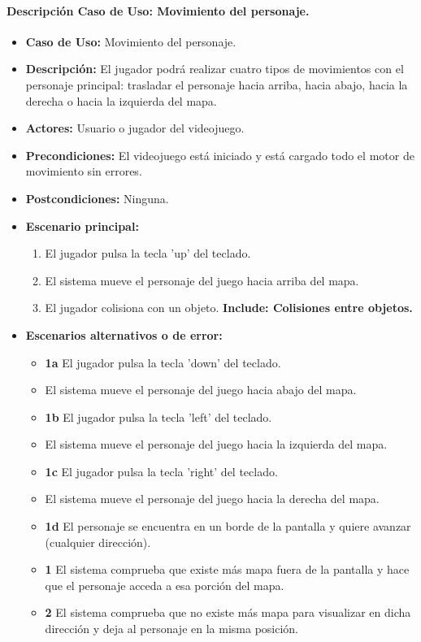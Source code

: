 \documentclass[a4paper,10pt]{article}
\begin{document}
\paragraph*{Descripción Caso de Uso: Movimiento del personaje.}
\begin{itemize}
\item \textbf{Caso de Uso:} Movimiento del personaje.
\item \textbf{Descripción:} El jugador podrá realizar cuatro tipos de
  movimientos con el personaje principal: trasladar el personaje hacia arriba,
  hacia abajo, hacia la derecha o hacia la izquierda del mapa.
\item \textbf{Actores:} Usuario o jugador del videojuego.
\item \textbf{Precondiciones:} El videojuego está iniciado y está cargado todo
  el motor de movimiento sin errores.
\item \textbf{Postcondiciones:} Ninguna.
\item \textbf{Escenario principal:} \\
\begin{enumerate}
\item El jugador pulsa la tecla 'up' del teclado.
\item El sistema mueve el personaje del juego hacia arriba del mapa.
\item El jugador colisiona con un objeto. \textbf{Include: Colisiones entre objetos.}
\end{enumerate}
\item \textbf{Escenarios alternativos o de error:} \\
\begin{itemize}
\item \textbf{1a} El jugador pulsa la tecla 'down' del teclado.
\item \textbf{  } El sistema mueve el personaje del juego hacia abajo del
  mapa.
\item \textbf{1b} El jugador pulsa la tecla 'left' del teclado.
\item \textbf{  } El sistema mueve el personaje del juego hacia la izquierda
  del mapa.
\item \textbf{1c} El jugador pulsa la tecla 'right' del teclado.
\item \textbf{  } El sistema mueve el personaje del juego hacia la derecha del
  mapa.
\item \textbf{1d} El personaje se encuentra en un borde de la pantalla y quiere
  avanzar (cualquier dirección).
\item \textbf{ 1} El sistema comprueba que existe más mapa fuera de la
  pantalla y hace que el personaje acceda a esa porción del mapa.
\item \textbf{ 2} El sistema comprueba que no existe más mapa para visualizar
  en dicha dirección y deja al personaje en la misma posición.
\end{itemize}
\end{itemize}
\end{document}
